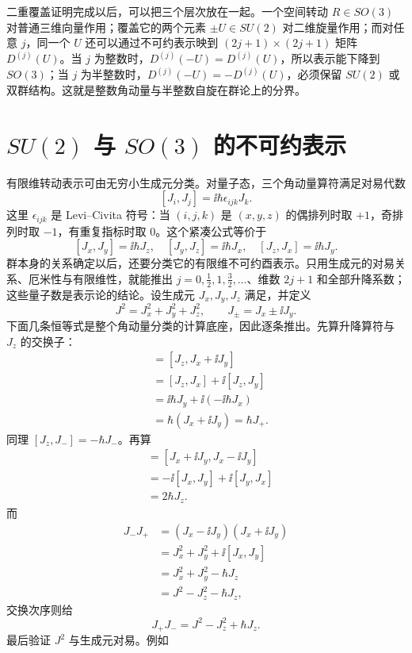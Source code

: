 二重覆盖证明完成以后，可以把三个层次放在一起。一个空间转动 $R\in SO(3)$ 对普通三维向量作用；覆盖它的两个元素 $\pm U\in SU(2)$ 对二维旋量作用；而对任意 $j$，同一个 $U$ 还可以通过不可约表示映到 $(2j+1)\times(2j+1)$ 矩阵 $D^{(j)}(U)$。当 $j$ 为整数时，$D^{(j)}(-U)=D^{(j)}(U)$，所以表示能下降到 $SO(3)$；当 $j$ 为半整数时，$D^{(j)}(-U)=-D^{(j)}(U)$，必须保留 $SU(2)$ 或双群结构。这就是整数角动量与半整数自旋在群论上的分界。

\section{\texorpdfstring{$SU(2)$ 与 $SO(3)$}{SU(2) 与 SO(3)} 的不可约表示}
\label{sec:rotation-irreps}

有限维转动表示可由无穷小生成元分类。对量子态，三个角动量算符满足对易代数
\[
[J_i,J_j]=\ii\hbar\epsilon_{ijk}J_k.
\]
这里 $\epsilon_{ijk}$ 是 Levi--Civita 符号：当 $(i,j,k)$ 是 $(x,y,z)$ 的偶排列时取 $+1$，奇排列时取 $-1$，有重复指标时取 $0$。这个紧凑公式等价于
\[
[J_x,J_y]=\ii\hbar J_z,
\quad [J_y,J_z]=\ii\hbar J_x,
\quad [J_z,J_x]=\ii\hbar J_y.
\]
群本身的关系确定以后，还要分类它的有限维不可约酉表示。只用生成元的对易关系、厄米性与有限维性，就能推出 $j=0,\tfrac12,1,\tfrac32,\dots$、维数 $2j+1$ 和全部升降系数；这些量子数是表示论的结论。设生成元 $J_x,J_y,J_z$ 满足，并定义
\[
J^2=J_x^2+J_y^2+J_z^2,
\qquad
J_\pm=J_x\pm\ii J_y.
\]
下面几条恒等式是整个角动量分类的计算底座，因此逐条推出。先算升降算符与 $J_z$ 的交换子：
\begin{align*}
[J_z,J_+]
&=[J_z,J_x+\ii J_y]\\
&=[J_z,J_x]+\ii[J_z,J_y]\\
&=\ii\hbar J_y+\ii(-\ii\hbar J_x)\\
&=\hbar(J_x+\ii J_y)=\hbar J_+.
\end{align*}
同理 $[J_z,J_-]=-\hbar J_-$。再算
\begin{align*}
[J_+,J_-]
&=[J_x+\ii J_y,J_x-\ii J_y]\\
&=-\ii[J_x,J_y]+\ii[J_y,J_x]\\
&=2\hbar J_z.
\end{align*}
而
\begin{align*}
J_-J_+
&=(J_x-\ii J_y)(J_x+\ii J_y)\\
&=J_x^2+J_y^2+\ii[J_x,J_y]\\
&=J_x^2+J_y^2-\hbar J_z\\
&=J^2-J_z^2-\hbar J_z,
\end{align*}
交换次序则给
\[
J_+J_-=J^2-J_z^2+\hbar J_z.
\]
最后验证 $J^2$ 与生成元对易。例如
